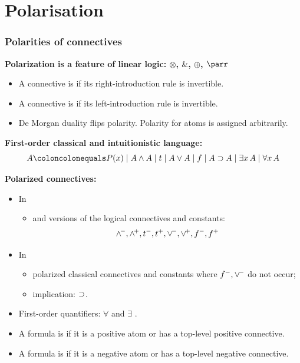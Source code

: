 \documentclass[9pt]{beamer}
\begin{document}
\section{Polarisation}
\begin{frame}
\frametitle{Polarities of connectives}

\textbf{{Polarization is a feature of linear logic: $\otimes$, $\&$,
    $\oplus$, $\parr$}}
\begin{itemize}
  \item A connective is  if its right-introduction rule is invertible.
  \item A connective is  if its left-introduction rule is invertible.
  \item De Morgan duality flips polarity.  Polarity for atoms is
    assigned arbitrarily.
\end{itemize}
\vfill
\pause

\textbf{First-order classical and intuitionistic language:}
$$A\coloncolonequals P(x) \mid A \wedge A \mid t \mid A \vee A 
        \mid f \mid A \impl A \mid \exists x\, A \mid \forall x\, A$$
\vfill

\textbf{{Polarized connectives:}}
\begin{itemize}
\item In 
\begin{itemize}
\item {} and  versions of the logical connectives and constants: 
\[\wedge^{\!-}, \wedge^{\!+}, t^-, t^+,\vee^{\!-}, \vee^{\!+}, f^-, f^+\]
\end{itemize}
\item In  
\begin{itemize}
\item polarized classical connectives and constants where $f^-,\vee^{\!-}$ do not occur;
\item {} implication: $\supset$.
\end{itemize}
\item First-order quantifiers: $\forall$  and $\exists$ .
\item A formula is  if it is a positive atom or has a
top-level positive connective.
\item A formula is  if it is a
negative atom or has a top-level negative connective.
\end{itemize}
\end{frame}
\end{document}
